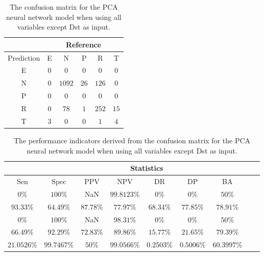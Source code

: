 \begin{table}[!ht]
	\centering
	\begin{tabular}{|c|c|c|c|c|c|}
		\hline
		 & \multicolumn{5}{|c|}{Reference} \\ \hline
		 Prediction & E & N & P & R & T \\ \hline
		 E & $0$ & $0$ & $0$ & $0$ & $0$ \\ \hline
		 N & $0$ & $1092$ & $26$ & $126$ & $0$ \\ \hline
		 P & $0$ & $0$ & $0$ & $0$ & $0$ \\ \hline
		 R & $0$ & $78$ & $1$ & $252$ & $15$ \\ \hline
		 T & $3$ & $0$ & $0$ & $1$ & $4$ \\ \hline
	\end{tabular}
	\caption{The confusion matrix for the PCA neural network model when using all variables except Dst as input.}
	\label{tab:cm:noDst:pcaNNet}
\end{table}

\begin{table}[!ht]
	\centering
	\begin{tabular}{|c|c|c|c|c|c|c|c|c|}
		\hline
		 & \multicolumn{7}{c|}{Statistics} \\ \hline
		Sen & Spec & PPV & NPV & DR & DP & BA \\ \hline
		$0\%$ & $100\%$ & NaN & $99.8123\%$ & $0\%$ & $0\%$ & $50\%$ \\ \hline
		$93.33\%$ & $64.49\%$ & $87.78\%$ & $77.97\%$ & $68.34\%$ & $77.85\%$ & $78.91\%$ \\ \hline
		$0\%$ & $100\%$ & NaN & $98.31\%$ & $0\%$ & $0\%$ & $50\%$ \\ \hline
		$66.49\%$ & $92.29\%$ & $72.83\%$ & $89.86\%$ & $15.77\%$ & $21.65\%$ & $79.39\%$ \\ \hline
		$21.0526\%$ & $99.7467\%$ & $50\%$ & $99.0566\%$ & $0.2503\%$ & $0.5006\%$ & $60.3997\%$ \\ \hline
	\end{tabular}
	\caption{The performance indicators derived from the confusion matrix for the PCA neural network model when using all variables except Dst as input.}
	\label{tab:cs:noDst:pcaNNet}
\end{table}
